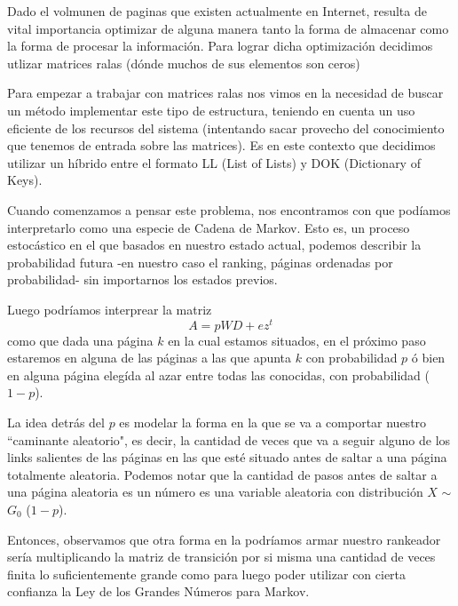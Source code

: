 \par Dado el volmunen de paginas que existen actualmente en Internet, resulta de vital importancia 
optimizar de alguna manera tanto la forma de almacenar
como la forma de procesar la informaci\'on. Para lograr dicha optimizaci\'on decidimos utlizar matrices ralas
 (d\'onde muchos de sus elementos son ceros)
\par Para empezar a trabajar con matrices ralas nos vimos en la necesidad de buscar un método implementar
 este tipo de estructura, teniendo en cuenta un uso eficiente de los recursos del sistema 
 (intentando sacar provecho del conocimiento que tenemos de entrada sobre las matrices). 
Es en este contexto que decidimos utilizar un h\'ibrido entre el formato LL (List of Lists) y 
DOK (Dictionary of Keys).\newline


Cuando comenzamos a pensar este problema, nos encontramos con que pod\'iamos interpretarlo como una especie de Cadena de Markov. Esto es, un proceso estoc\'astico en el que basados en nuestro estado actual, podemos describir la probabilidad futura -en nuestro caso el ranking, p\'aginas ordenadas por probabilidad- sin importarnos los estados previos.\newline

Luego podr\'iamos interprear la matriz \begin{equation}
    A = p WD + ez^{t}
\end{equation}
como que dada una p\'agina $k$ en la cual estamos situados, en el pr\'oximo paso estaremos en alguna de las p\'aginas a las que apunta $k$ con probabilidad $p$ \'o bien en alguna p\'agina eleg\'ida al azar entre todas las conocidas, con probabilidad ($1-p$).\newline

La idea detr\'as del $p$ es modelar la forma en la que se va a comportar nuestro ``caminante aleatorio", es decir, la cantidad de veces que va a seguir alguno de los links salientes de las p\'aginas en las que est\'e situado antes de saltar a una p\'agina totalmente aleatoria.
Podemos notar que la cantidad de pasos antes de saltar a una p\'agina aleatoria es un n\'umero es una variable aleatoria con distribuci\'on         $X$ $\sim$ $G_0$ ($1-p$).\newline

Entonces, observamos que otra forma en la podr\'iamos armar nuestro rankeador ser\'ia multiplicando la matriz de transici\'on por si misma una cantidad de veces finita lo suficientemente grande como para luego poder utilizar con cierta confianza la Ley de los Grandes N\'umeros para Markov.